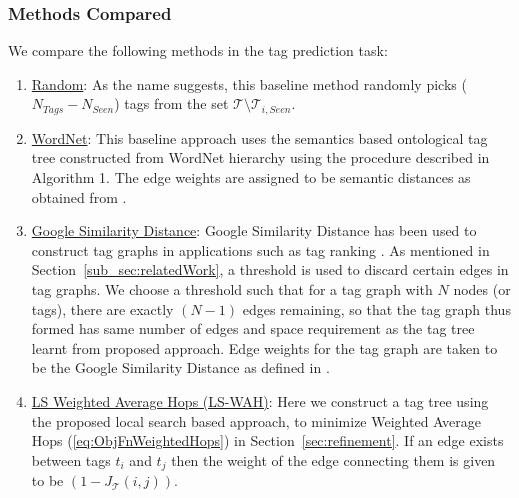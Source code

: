 \subsubsection{Methods Compared} 
\label{sec:comparison}
We compare the following methods in the tag prediction task:
\begin{enumerate}
\item \underline{Random}: As the name suggests, this baseline method randomly picks  ($N_{Tags} - N_{Seen}$)  tags from the set $\mathcal{T} \setminus \mathcal{T}_{i,Seen}$. 

\item \underline{WordNet}: This baseline approach uses the semantics based ontological tag tree constructed from WordNet hierarchy using the procedure described in Algorithm 1. The edge weights are assigned to be semantic distances as obtained from \cite{RitaLibraryWordNet}. 
\item \underline{Google Similarity Distance}:  Google Similarity Distance \cite{cilibrasi2007google} has been used to construct tag graphs in applications such as tag ranking \cite{liu2009tag}. As mentioned in Section~\ref{sub_sec:relatedWork}, a threshold is used to discard certain edges in tag graphs. We choose a threshold such that for a tag graph with $N$ nodes (or tags), there are exactly $(N-1)$ edges remaining, so that the tag graph thus formed has same number of edges and space requirement as the tag tree learnt from proposed approach. Edge weights for the tag graph are taken to be the Google Similarity Distance as defined in \cite{cilibrasi2007google}. 


\item \underline{LS Weighted Average Hops (LS-WAH)}:  Here we construct a tag tree using the proposed local search based approach, to minimize Weighted Average Hops (\ref{eq:ObjFnWeightedHops}) in Section~\ref{sec:refinement}. If an edge exists between tags $t_i$ and $t_j$ then the weight of the edge connecting them is given to be $(1-J_{\mathcal{T}}(i,j))$. 


\end{enumerate}
